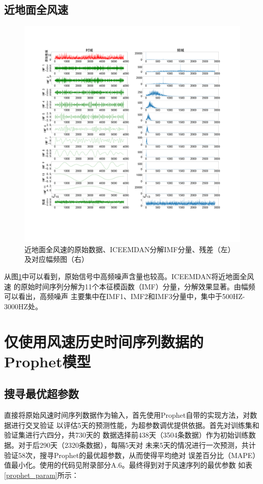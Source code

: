 \documentclass[AutoFakeBold]{LZUThesis}
\begin{document}
\subsection{近地面全风速}
\begin{figure}[H]
	\centering
    \includegraphics[width=1\textwidth]{figures/wind.pdf}
    \caption{近地面全风速的原始数据、ICEEMDAN分解IMF分量、残差（左）及对应幅频图（右）}
    \label{fig_wind}
\end{figure}

从图\ref{fig_wind}中可以看到，原始信号中高频噪声含量也较高。ICEEMDAN将近地面全风速
的原始时间序列分解为11个本征模函数（IMF）分量，分解效果显著。由幅频可以看出，高频噪声
主要集中在IMF1、IMF2和IMF3分量中，集中于500HZ-3000HZ处。

\section{仅使用风速历史时间序列数据的Prophet模型}
\subsection{搜寻最优超参数}
直接将原始风速时间序列数据作为输入，首先使用Prophet自带的实现方法，对数据进行交叉验证
以评估5天的预测性能，为超参数调优提供依据。首先对训练集和验证集进行六四分，共730天的
数据选择前438天（3504条数据）作为初始训练数据。对于后290天（2320条数据），每隔5天对
未来5天的情况进行一次预测，共计验证58次，搜寻Prophet的最优超参数，从而使得平均绝对
误差百分比（MAPE）值最小化。使用的代码见附录部分A.6。最终得到对于风速序列的最优参数
如表\ref{prophet_param}所示：
\end{document}
